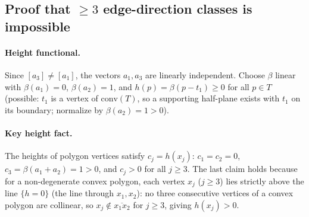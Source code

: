 %
%
%
%

\subsection*{Proof that $\geq 3$ edge-direction classes is impossible}

\paragraph{Height functional.}
Since $[a_3] \neq [a_1]$, the vectors $a_1, a_3$ are linearly independent.  Choose $\beta$
linear with $\beta(a_1) = 0$, $\beta(a_2) = 1$, and $h(p) = \beta(p-t_1) \geq 0$ for all
$p \in T$ (possible: $t_1$ is a vertex of $\mathrm{conv}(T)$, so a supporting half-plane
exists with $t_1$ on its boundary; normalize by $\beta(a_2) = 1 > 0$).

\paragraph{Key height fact.}
The heights of polygon vertices satisfy $c_j = h(x_j)$:
$c_1 = c_2 = 0$, $c_3 = \beta(a_1+a_2) = 1 > 0$, and $c_j > 0$ for all $j \geq 3$.
The last claim holds because for a non-degenerate convex polygon, each vertex $x_j$
($j \geq 3$) lies strictly above the line $\{h=0\}$ (the line through $x_1, x_2$):
no three consecutive vertices of a convex polygon are collinear, so $x_j \not\in
\overline{x_1 x_2}$ for $j \geq 3$, giving $h(x_j) > 0$.

